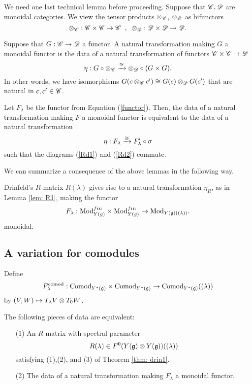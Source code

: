 \documentclass[11pt]{amsart}
\def\yscomod{{\rm Comod}_{Y^*(\fg)}}
\def\yslcomod{{\rm Comod}_{Y^*(\fg)}((\lambda))}
\begin{document}
We need one last technical lemma before proceeding.
Suppose that $\mathscr C, \mathscr D$ are monoidal categories.
We view the tensor products $\otimes_{\mathscr C}$, $\otimes_{\mathscr D}$ as bifunctors
\[
\otimes_{\mathscr C} : \mathscr C \times \mathscr C \to \mathscr C \;\; , \;\; \otimes_{\mathscr D} : \mathscr D \times \mathscr D \to \mathscr D .
\]

Suppose that $G : \mathscr C \to \mathscr D$ a functor.
A natural transformation making $G$ a monoidal functor is the data of a natural transformation of functors $\mathscr C \times \mathscr C \to \mathscr D$
\[
\eta : G \circ \otimes_{\mathscr C} \xrightarrow{\cong} \otimes_{\mathscr D} \circ (G \times G) .
\]
In other words, we have isomorphisms $G(c \otimes_{\mathscr C} c') \cong G(c) \otimes_{\mathscr D} G(c')$ that are natural in $c,c' \in \mathscr C$. 

\begin{lem}
Let $F_\lambda$ be the functor from Equation (\ref{functor}).
Then, the data of a natural transformation making $F$ a monoidal functor is equivalent to the data of a natural transformation
\[
\eta : F_\lambda \xrightarrow{\cong} F'_\lambda \circ \sigma 
\]
such that the diagrams (\ref{Rd1}) and (\ref{Rd2}) commute. 
\end{lem}

We can summarize a consequence of the above lemmas in the following way. 

\begin{thm}
Drinfeld's $R$-matrix $R(\lambda)$ gives rise to a natural transformation $\eta_R$, as in Lemma \ref{lem: R1}, making the functor
\[
F_\lambda : {\rm Mod}_{Y(g)}^{fin} \times {\rm Mod}_{Y(g)}^{fin} \to {\rm Mod}_{Y(\mathfrak g)((\lambda))} .
\]
monoidal. 
\end{thm}

\subsection{A variation for comodules}

Define 
\[
F^{\rm comod}_{\lambda} : \yscomod \times \yscomod \to \yslcomod 
\]
by $(V,W) \mapsto T_{\lambda} V \otimes T_0 W$. 
 
\begin{thm}\label{thm: comodequiv}
The following pieces of data are equivalent:
\begin{itemize}
\item[(1)] An $R$-matrix with spectral parameter
\[
R(\lambda) \in F^0(Y(\mathfrak g) \otimes Y(\mathfrak g))((\lambda))
\]
satisfying (1),(2), and (3) of Theorem \ref{thm: drin1}.
\item[(2)] 
The data of a natural transformation making $F_\lambda$ a monoidal functor.
\end{itemize}
\end{thm}
\end{document}
